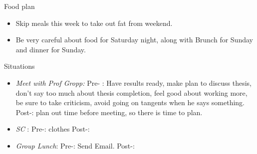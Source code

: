 \documentclass[serif, mathserif, final]{beamer}
\begin{document}
\begin{frame}{}
\begin{columns}
\begin{column}{0.20\linewidth}
  \begin{block}{Food plan } 
    \begin{itemize} 
      \tiny \item \tiny Skip meals this week to take out fat from weekend. 
    \item \tiny Be very careful about food for Saturday night, along with Brunch for Sunday and dinner for Sunday. 
    \end{itemize} 
  \end{block} 
  \begin{block}{Situations} 
    \begin{itemize} 
    \item \tiny \textit{Meet with Prof Gropp: } Pre- : Have results ready, make plan to discuss thesis, don't say too much about thesis completion, feel good about working more, be sure to take criticism, avoid going on tangents when he says something.   
      Post-: plan out time before meeting, so there is time to plan. 
    \item \tiny \textit{SC} : Pre-: clothes   Post-:  
    \item \tiny \textit{Group Lunch}:  Pre-: Send Email.  Post-: 
    \end{itemize}
  \end{block}
\end{column}%

\end{columns}

\end{frame}
\end{document}
